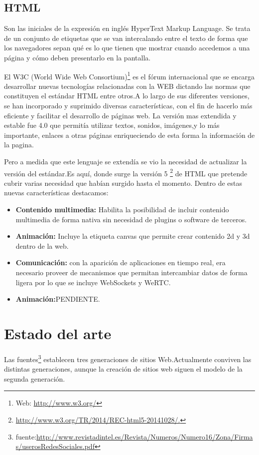 \subsection*{HTML}
Son las iniciales de la expresión en inglés HyperText Markup Language. Se trata de un conjunto de etiquetas que se van intercalando entre el texto de forma que los  navegadores sepan qué es lo que tienen que mostrar cuando accedemos a una página y cómo deben presentarlo en la pantalla.

El W3C (World Wide Web Consortium)\footnote{Web: \url{http://www.w3.org/}} es el fórum internacional que se encarga desarrollar nuevas tecnologías relacionadas con la WEB dictando las normas que constituyen el estándar HTML entre otros.A lo largo de sus diferentes versiones, se han incorporado y suprimido diversas características, con el fin de hacerlo más eficiente y facilitar el desarrollo de páginas web.
La versión mas extendida y estable fue 4.0 que permitía utilizar textos, sonidos, imágenes,y lo más importante, enlaces a otras páginas enriqueciendo de esta forma la información de la pagina.

Pero a medida que este lenguaje se extendía se vio la necesidad de actualizar la versión del estándar.Es aquí, donde surge la versión 5 \footnote{\url{http://www.w3.org/TR/2014/REC-html5-20141028/.}} de HTML que pretende cubrir varias necesidad que habían surgido hasta el momento. Dentro de estas nuevas características destacamos:
\begin{itemize}
\item \textbf{Contenido multimedia:} Habilita la posibilidad de incluir contenido multimedia de forma nativa sin necesidad de plugins o software de terceros.
\item \textbf{Animación:} Incluye la etiqueta canvas que permite crear contenido 2d y 3d dentro de la web.
\item \textbf{Comunicación:} con la aparición de aplicaciones en tiempo real, era necesario proveer de mecanismos que permitan intercambiar datos de forma ligera por lo que se incluye WebSockets y WeRTC.
\item \textbf{Animación:}PENDIENTE.
\end{itemize}
\section{Estado del arte}
Las fuentes\footnote{fuente:\url{http://www.revistadintel.es/Revista/Numeros/Numero16/Zona/Firmas/userosRedesSociales.pdf}} establecen tres generaciones de sitios Web.Actualmente conviven las distintas generaciones, aunque la creación de sitios web siguen el modelo de la segunda generación.
